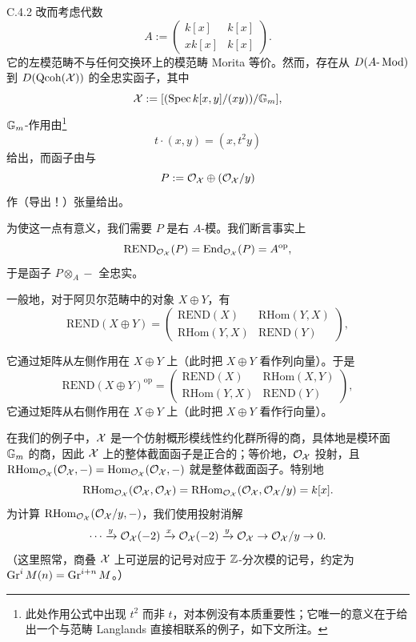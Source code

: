 \begin{exam}{C.4.2}\label{thm:a4-19-9}
改而考虑代数
\[
A:=\begin{pmatrix}k[x]&k[x]\\xk[x]&k[x]\end{pmatrix}.
\]
它的左模范畴不与任何交换环上的模范畴 Morita 等价。然而，存在从 $D(A\text{-}\operatorname{Mod})$ 到 $D(\operatorname{Qcoh}(\mathcal{X}))$ 的全忠实函子，其中
\[
\mathcal{X}:=[(\operatorname{Spec} k[x,y]/(xy))/\mathbb{G}_m],
\]
$\mathbb{G}_m$-作用由\footnote{此处作用公式中出现 $t^2$ 而非 $t$，对本例没有本质重要性；它唯一的意义在于给出一个与范畴 Langlands 直接相联系的例子，如下文所注。}
\[
t\cdot(x,y)=(x,t^2y)
\]
给出，而函子由与
\[
P:=\mathcal{O}_{\mathcal{X}}\oplus(\mathcal{O}_{\mathcal{X}}/y)
\]
作（导出！）张量给出。

为使这一点有意义，我们需要 $P$ 是右 $A$-模。我们断言事实上
\[
\mathrm{REND}_{\mathcal{O}_{\mathcal{X}}}(P)=\operatorname{End}_{\mathcal{O}_{\mathcal{X}}}(P)=A^{\mathrm{op}},
\]
于是函子 $P\otimes_A-$ 全忠实。

一般地，对于阿贝尔范畴中的对象 $X\oplus Y$，有
{\small
\[
\mathrm{REND}(X\oplus Y)=\begin{pmatrix}\mathrm{REND}(X)&\mathrm{RHom}(Y,X)\\\mathrm{RHom}(Y,X)&\mathrm{REND}(Y)\end{pmatrix},
\]
}


它通过矩阵从左侧作用在 $X\oplus Y$ 上（此时把 $X\oplus Y$ 看作列向量）。于是
{\small
\[
\mathrm{REND}(X\oplus Y)^{\mathrm{op}}=\begin{pmatrix}\mathrm{REND}(X)&\mathrm{RHom}(X,Y)\\\mathrm{RHom}(Y,X)&\mathrm{REND}(Y)\end{pmatrix},
\]
}
它通过矩阵从右侧作用在 $X\oplus Y$ 上（此时把 $X\oplus Y$ 看作行向量）。

在我们的例子中，$\mathcal{X}$ 是一个仿射概形模线性约化群所得的商，具体地是模环面 $\mathbb{G}_m$ 的商，因此 $\mathcal{X}$ 上的整体截面函子是正合的；等价地，$\mathcal{O}_{\mathcal{X}}$ 投射，且 $\mathrm{RHom}_{\mathcal{O}_{\mathcal{X}}}(\mathcal{O}_{\mathcal{X}},-)=\operatorname{Hom}_{\mathcal{O}_{\mathcal{X}}}(\mathcal{O}_{\mathcal{X}},-)$ 就是整体截面函子。特别地
\[
\mathrm{RHom}_{\mathcal{O}_{\mathcal{X}}}(\mathcal{O}_{\mathcal{X}},\mathcal{O}_{\mathcal{X}})=\mathrm{RHom}_{\mathcal{O}_{\mathcal{X}}}(\mathcal{O}_{\mathcal{X}},\mathcal{O}_{\mathcal{X}}/y)=k[x].
\]
为计算 $\mathrm{RHom}_{\mathcal{O}_{\mathcal{X}}}(\mathcal{O}_{\mathcal{X}}/y,-)$，我们使用投射消解
\[
\cdots\xrightarrow{y}\mathcal{O}_{\mathcal{X}}(-2)\xrightarrow{x}\mathcal{O}_{\mathcal{X}}(-2)\xrightarrow{y}\mathcal{O}_{\mathcal{X}}\to\mathcal{O}_{\mathcal{X}}/y\to0.
\]
（这里照常，商叠 $\mathcal{X}$ 上可逆层的记号对应于 $\mathbb{Z}$-分次模的记号，约定为 $\operatorname{Gr}^iM(n)=\operatorname{Gr}^{i+n}M$。）


\end{exam}
